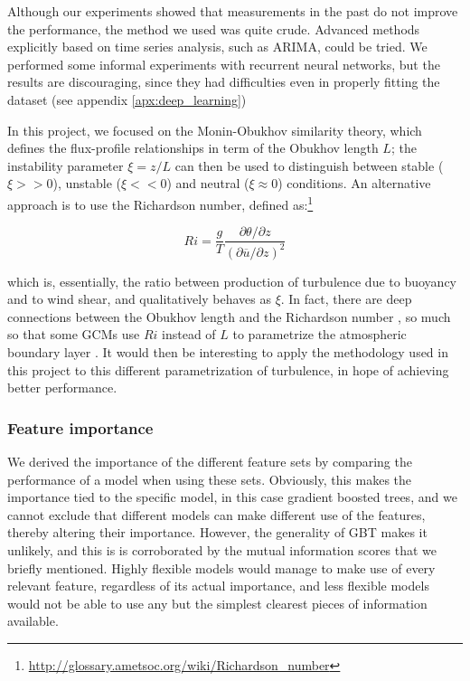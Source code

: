 \documentclass[a4paper,11pt]{kth-mag}
\begin{document}
Although our experiments showed that measurements in the past do not improve the performance, the method we used was quite crude. Advanced methods explicitly based on time series analysis, such as ARIMA, could be tried. We performed some informal experiments with recurrent neural networks, but the results are discouraging, since they had difficulties even in properly fitting the dataset (see appendix \ref{apx:deep_learning})

In this project, we focused on the Monin-Obukhov similarity theory, which defines the flux-profile relationships in term of the Obukhov length $L$; the instability parameter $\xi=z/L$ can then be used to distinguish between stable ($\xi>>0$), unstable ($\xi<<0$) and neutral ($\xi\approx0$) conditions. An alternative approach is to use the Richardson number, defined as:\footnote{\url{http://glossary.ametsoc.org/wiki/Richardson_number}}

\begin{equation}
Ri=\frac{g}{T}\frac{\partial\theta/\partial z}{(\partial\overline{u}/\partial z)^2}
\end{equation}

\noindent which is, essentially, the ratio between production of turbulence due to buoyancy and to wind shear, and qualitatively behaves as $\xi$. In fact, there are deep connections between the Obukhov length and the Richardson number \citep{mostayyyy}, so much so that some GCMs use $Ri$ instead of $L$ to parametrize the atmospheric boundary layer \citep{gfdl_am2,gfdl_am3}. It would then be interesting to apply the methodology used in this project to this different parametrization of turbulence, in hope of achieving better performance.

\subsubsection{Feature importance}
We derived the importance of the different feature sets by comparing the performance of a model when using these sets. Obviously, this makes the importance tied to the specific model, in this case gradient boosted trees, and we cannot exclude that different models can make different use of the features, thereby altering their importance. However, the generality of GBT makes it unlikely, and this is is corroborated by the mutual information scores that we briefly mentioned. Highly flexible models would manage to make use of every relevant feature, regardless of its actual importance, and less flexible models would not be able to use any but the simplest clearest pieces of information available.
\end{document}
